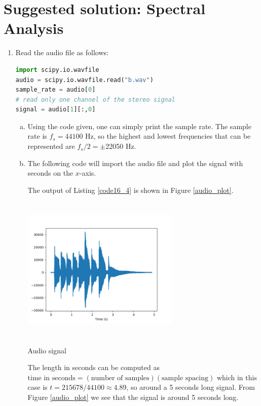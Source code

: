 
\newpage
\section{Suggested solution: Spectral Analysis}

\begin{enumerate}
  \item Read the audio file as follows:
        \begin{lstlisting}[language=Python]
import scipy.io.wavfile
audio = scipy.io.wavfile.read("b.wav")
sample_rate = audio[0]
# read only one channel of the stereo signal
signal = audio[1][:,0]
\end{lstlisting}

        \begin{enumerate}[a)]
          \item Using the code given, one can simply print the sample rate.
                The sample rate is $f_s=44100$ Hz, so the highest and lowest frequencies that can be represented are $f_{s}/2=\pm$22050 Hz.

          \item The following code will import the audio file and plot the signal with seconds on the $x$-axis.
                

                The output of Listing \ref{code16_4} is shown in Figure \ref{audio_plot}.
                \begin{marginfigure}
                  \centering
                  \includegraphics[width=7.5cm,height=7.0cm]{ch16/figures/audio.png}
                  \caption{Audio signal}
                  \label{audio_plot}
                \end{marginfigure}
                The length in seconds can be computed as $\text{time in seconds}=(\text{number of samples})(\text{sample spacing})$
                which in this case is $t=215678/44100\approx 4.89$, so around a 5 seconds long signal. From Figure \ref{audio_plot} we see that the signal is around 5 seconds long.


\end{enumerate}
\end{enumerate}
